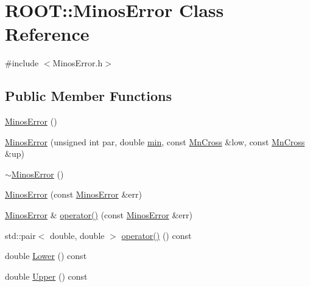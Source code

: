 \hypertarget{classROOT_1_1Minuit2_1_1MinosError}{}\section{R\+O\+OT\+:\+:Minos\+Error Class Reference}
\label{classROOT_1_1Minuit2_1_1MinosError}


{\ttfamily \#include $<$Minos\+Error.\+h$>$}

\subsection*{Public Member Functions}
\begin{DoxyCompactItemize}
\item 
\mbox{\hyperlink{classROOT_1_1Minuit2_1_1MinosError_a5cb0fad5d73d20905a57fb1c505c9fd2}{Minos\+Error}} ()
\item 
\mbox{\hyperlink{classROOT_1_1Minuit2_1_1MinosError_a400609986f7b4e3a93eab1a35e1f33ce}{Minos\+Error}} (unsigned int par, double \mbox{\hyperlink{adat__devel_2lib_2SU3_2SU3__internal_8h_ab0f5fed3171eb00d1c5f037d9f518a23}{min}}, const \mbox{\hyperlink{classROOT_1_1Minuit2_1_1MnCross}{Mn\+Cross}} \&low, const \mbox{\hyperlink{classROOT_1_1Minuit2_1_1MnCross}{Mn\+Cross}} \&up)
\item 
\mbox{\hyperlink{classROOT_1_1Minuit2_1_1MinosError_a8373afe22cd395ed995a061691c48dad}{$\sim$\+Minos\+Error}} ()
\item 
\mbox{\hyperlink{classROOT_1_1Minuit2_1_1MinosError_a95d558825494f594da873fef3518572e}{Minos\+Error}} (const \mbox{\hyperlink{classROOT_1_1Minuit2_1_1MinosError}{Minos\+Error}} \&err)
\item 
\mbox{\hyperlink{classROOT_1_1Minuit2_1_1MinosError}{Minos\+Error}} \& \mbox{\hyperlink{classROOT_1_1Minuit2_1_1MinosError_ac45b7f3397fe4c13e1811b486e10602a}{operator()}} (const \mbox{\hyperlink{classROOT_1_1Minuit2_1_1MinosError}{Minos\+Error}} \&err)
\item 
std\+::pair$<$ double, double $>$ \mbox{\hyperlink{classROOT_1_1Minuit2_1_1MinosError_ae5c75a96400736de9741f6c5b8314e31}{operator()}} () const
\item 
double \mbox{\hyperlink{classROOT_1_1Minuit2_1_1MinosError_ac412aab9b0a59a427fbe7e3cfad47f0c}{Lower}} () const
\item 
double \mbox{\hyperlink{classROOT_1_1Minuit2_1_1MinosError_a0223fde13608aadee1f15b51d15b2bf6}{Upper}} () const
\item 

\end{DoxyCompactItemize}
